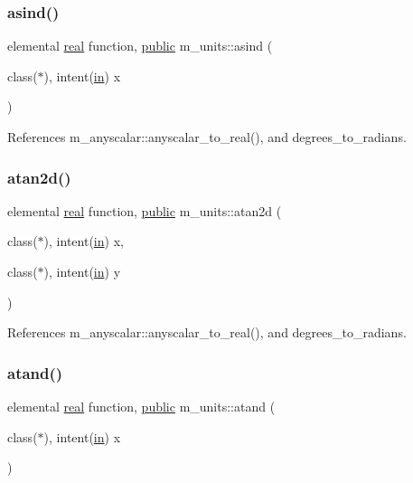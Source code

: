 \subsubsection{\texorpdfstring{asind()}{asind()}}
{\footnotesize\ttfamily elemental \hyperlink{read__watch_83_8txt_abdb62bde002f38ef75f810d3a905a823}{real} function, \hyperlink{M__stopwatch_83_8txt_a2f74811300c361e53b430611a7d1769f}{public} m\+\_\+units\+::asind (\begin{DoxyParamCaption}\item[{class($\ast$), intent(\hyperlink{M__journal_83_8txt_afce72651d1eed785a2132bee863b2f38}{in})}]{x }\end{DoxyParamCaption})}



References m\+\_\+anyscalar\+::anyscalar\+\_\+to\+\_\+real(), and degrees\+\_\+to\+\_\+radians.

\mbox{\label{namespacem__units_a09403aaa43be5c74f7b9a3c2df2d1460}} 
\subsubsection{\texorpdfstring{atan2d()}{atan2d()}}
{\footnotesize\ttfamily elemental \hyperlink{read__watch_83_8txt_abdb62bde002f38ef75f810d3a905a823}{real} function, \hyperlink{M__stopwatch_83_8txt_a2f74811300c361e53b430611a7d1769f}{public} m\+\_\+units\+::atan2d (\begin{DoxyParamCaption}\item[{class($\ast$), intent(\hyperlink{M__journal_83_8txt_afce72651d1eed785a2132bee863b2f38}{in})}]{x,  }\item[{class($\ast$), intent(\hyperlink{M__journal_83_8txt_afce72651d1eed785a2132bee863b2f38}{in})}]{y }\end{DoxyParamCaption})}



References m\+\_\+anyscalar\+::anyscalar\+\_\+to\+\_\+real(), and degrees\+\_\+to\+\_\+radians.

\mbox{\label{namespacem__units_ac54e5d4cedc06c56d0de8e0138781be9}} 
\subsubsection{\texorpdfstring{atand()}{atand()}}
{\footnotesize\ttfamily elemental \hyperlink{read__watch_83_8txt_abdb62bde002f38ef75f810d3a905a823}{real} function, \hyperlink{M__stopwatch_83_8txt_a2f74811300c361e53b430611a7d1769f}{public} m\+\_\+units\+::atand (\begin{DoxyParamCaption}\item[{class($\ast$), intent(\hyperlink{M__journal_83_8txt_afce72651d1eed785a2132bee863b2f38}{in})}]{x }\end{DoxyParamCaption})}



